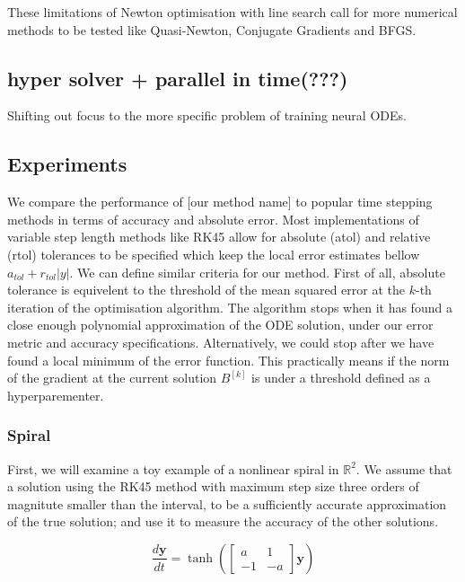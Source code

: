 \documentclass{article}
\begin{document}
    These limitations of Newton optimisation with line search call for more numerical methods to be tested like Quasi-Newton, Conjugate Gradients and BFGS.

    \subsection{hyper solver + parallel in time(???)}
    Shifting out focus to the more specific problem of training neural ODEs.

    \subsection{Experiments}
    We compare the performance of [our method name] to popular time stepping methods in terms of accuracy and absolute error.
    Most implementations of variable step length methods like RK45 allow for absolute (atol) and relative (rtol)
    tolerances to be specified which keep the local error estimates bellow $a_{tol} + r_{tol} |y|$.
    We can define similar criteria for our method.
    First of all, absolute tolerance is equivelent to the threshold of the mean squared error at the $k$-th iteration of
    the optimisation algorithm.
    The algorithm stops when it has found a close enough polynomial approximation of the ODE solution, under our error
    metric and accuracy specifications.
    Alternatively, we could stop after we have found a local minimum of the error function.
    This practically means if the norm of the gradient at the current solution $B^{[k]}$ is under a threshold defined as
    a hyperparementer.

    \subsubsection{Spiral}
    First, we will examine a toy example of a nonlinear spiral in $\mathbb{R}^{2}$.
    We assume that a solution using the RK45 method with maximum step size three orders of magnitute smaller than the
    interval, to be a sufficiently accurate approximation of the true solution; and use it to measure the accuracy of the
    other solutions.

    \begin{equation*}
        \frac{d \pmb{y} }{dt} =
        \tanh(
        \begin{bmatrix}
            a & 1 \\ -1 & -a
        \end{bmatrix}
        \pmb{y}
        )
    \end{equation*}
\end{document}

